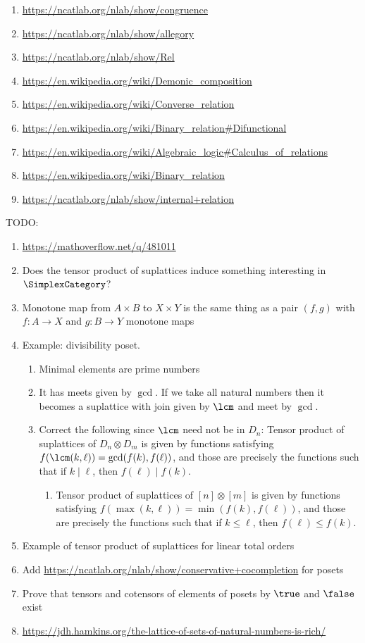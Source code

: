 \begin{enumerate}
    \item \url{https://ncatlab.org/nlab/show/congruence}
    \item \url{https://ncatlab.org/nlab/show/allegory}
    \item \url{https://ncatlab.org/nlab/show/Rel}
    \item \url{https://en.wikipedia.org/wiki/Demonic_composition}
    \item \url{https://en.wikipedia.org/wiki/Converse_relation}
    \item \url{https://en.wikipedia.org/wiki/Binary_relation#Difunctional}
    \item \url{https://en.wikipedia.org/wiki/Algebraic_logic#Calculus_of_relations}
    \item \url{https://en.wikipedia.org/wiki/Binary_relation}
    \item \url{https://ncatlab.org/nlab/show/internal+relation}
\end{enumerate}
TODO:
\begin{enumerate}
    \item \url{https://mathoverflow.net/q/481011}
    \item Does the tensor product of suplattices induce something interesting in $\SimplexCategory$?
    \item Monotone map from $A\times B$ to $X\times Y$ is the same thing as a pair $(f,g)$ with $f\colon A\to X$ and $g\colon B\to Y$ monotone maps
    \item Example: divisibility poset.
        \begin{enumerate}
            \item Minimal elements are prime numbers
            \item It has meets given by $\gcd$. If we take all natural numbers then it becomes a suplattice with join given by $\lcm$ and meet by $\gcd$.
            \item Correct the following since $\lcm$ need not be in $D_{n}$: Tensor product of suplattices of $D_{n}\otimes D_{m}$ is given by functions satisfying $f(\lcm(k,\ell))=\gcd(f(k),f(\ell))$, and those are precisely the functions such that if $k\mid\ell$, then $f(\ell)\mid f(k)$.
                \begin{enumerate}
                    \item Tensor product of suplattices of $[n]\otimes[m]$ is given by functions satisfying $f(\max(k,\ell))=\min(f(k),f(\ell))$, and those are precisely the functions such that if $k\leq\ell$, then $f(\ell)\leq f(k)$.
                \end{enumerate}
        \end{enumerate}
    \item Example of tensor product of suplattices for linear total orders
    \item Add \url{https://ncatlab.org/nlab/show/conservative+cocompletion} for posets
    \item Prove that tensors and cotensors of elements of posets by $\true$ and $\false$ exist
    \item \url{https://jdh.hamkins.org/the-lattice-of-sets-of-natural-numbers-is-rich/}
\end{enumerate}


